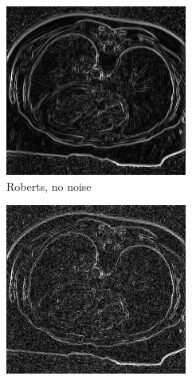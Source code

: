 \begin{figure}[H]
  \centering
  
  \begin{subfigure}{.5\textwidth}
    \centering
    \includegraphics[width=.9\textwidth]{./edgedetection/images/robert_no_noise}
    \caption{Roberts, no noise}
    \label{fig:robert_no_noise}
  \end{subfigure}%
  \begin{subfigure}{.5\textwidth}
    \centering
    \includegraphics[width=.9\textwidth]{./edgedetection/images/robert_001_noise}

\end{subfigure}
\end{figure}
